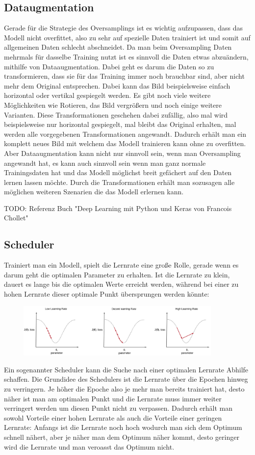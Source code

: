 \documentclass[12pt, a4paper]{article}
\begin{document}
\subsection{Dataugmentation}
Gerade für die Strategie des Oversamplings ist es wichtig aufzupassen, dass das Modell nicht overfittet, also zu sehr auf spezielle Daten trainiert ist und somit auf allgemeinen Daten schlecht abschneidet. Da man beim Oversampling Daten mehrmals für dasselbe Training nutzt ist es sinnvoll die Daten etwas abzuändern, mithilfe von Dataaugmentation. Dabei geht es darum die Daten so zu transformieren, dass sie für das Training immer noch brauchbar sind, aber nicht mehr dem Original entsprechen. Dabei kann das Bild beispielsweise einfach horizontal oder vertikal gespiegelt werden. Es gibt noch viele weitere Möglichkeiten wie Rotieren, das Bild vergrößern und noch einige weitere Varianten. Diese Transformationen geschehen dabei zufällig, also mal wird beispielsweise nur horizontal gespiegelt, mal bleibt das Original erhalten, mal werden alle vorgegebenen Transformationen angewandt. Dadurch erhält man ein komplett neues Bild mit welchem das Modell trainieren kann ohne zu overfitten. Aber Dataaugmentation kann nicht nur sinnvoll sein, wenn man Oversampling angewandt hat, es kann auch sinnvoll sein wenn man ganz normale Trainingsdaten hat und das Modell möglichst breit gefächert auf den Daten lernen lassen möchte. Durch die Transformationen erhält man sozusagen alle möglichen weiteren Szenarien die das Modell erlernen kann.

TODO: Referenz Buch "Deep Learning mit Python und Keras von Francois Chollet"

\subsection{Scheduler}
Trainiert man ein Modell, spielt die Lernrate eine große Rolle, gerade wenn es darum geht die optimalen Parameter zu erhalten. Ist die Lernrate zu klein, dauert es lange bis die optimalen Werte erreicht werden, während bei einer zu hohen Lernrate dieser optimale Punkt übersprungen werden könnte:
\begin{figure}[h]
\centering
\includegraphics[width=0.9\textwidth]{lernrates-vs.png}
\end{figure}
Ein sogenannter Scheduler kann die Suche nach einer optimalen Lernrate Abhilfe schaffen. Die Grundidee des Schedulers ist die Lernrate über die Epochen hinweg zu verringern. Je höher die Epoche also je mehr man bereits trainiert hat, desto näher ist man am optimalen Punkt und die Lernrate muss immer weiter verringert werden um diesen Punkt nicht zu verpassen. Dadurch erhält man sowohl Vorteile einer hohen Lernrate als auch die Vorteile einer geringen Lernrate: Anfangs ist die Lernrate noch hoch wodurch man sich dem Optimum schnell nähert, aber je näher man dem Optimum näher kommt, desto geringer wird die Lernrate und man veroasst das Optimum nicht.
\end{document}

